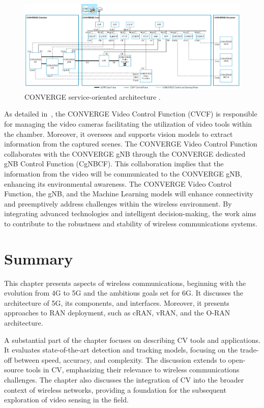 \begin{figure}[H]
    \centering
    \includegraphics[width=1\linewidth]{figures/arch_converge}
    \caption[CONVERGE service-oriented architecture] {CONVERGE service-oriented architecture \cite{converge2023_specs}.}
    \label{fig:converge_arch}
\end{figure}

As detailed in~\cite{converge2023_specs}, the CONVERGE Video Control Function (CVCF) is responsible for managing the video cameras facilitating the utilization
of video tools within the chamber.
Moreover, it oversees and supports
vision models to extract information from the captured scenes.
The CONVERGE Video Control Function collaborates with the CONVERGE gNB through the CONVERGE dedicated gNB Control Function (CgNBCF).
This collaboration implies that the information from the video will be communicated to the CONVERGE gNB, enhancing its environmental awareness.
The CONVERGE Video Control Function, the gNB, and the Machine Learning models will
enhance connectivity and preemptively address challenges within the wireless environment.
By integrating advanced technologies and intelligent decision-making, the work
aims to contribute to the robustness and stability of wireless communications systems.


\section{Summary}\label{sec:Summary_SOA}
This chapter presents aspects of wireless communications, beginning with the evolution from 4G to 5G and the ambitious goals set for 6G\@.
It discusses the architecture of 5G, its components, and interfaces.
Moreover, it presents approaches to RAN deployment, such as cRAN, vRAN, and the O-RAN architecture.

A substantial part of the chapter focuses on describing CV tools and applications.
It evaluates state-of-the-art detection and tracking models, focusing on the trade-off between speed, accuracy, and complexity.
The discussion extends to open-source tools in CV, emphasizing their relevance to wireless communications challenges.
The chapter also discusses the integration of CV into the broader context of wireless networks, providing a foundation for the subsequent exploration of video sensing in the field.


